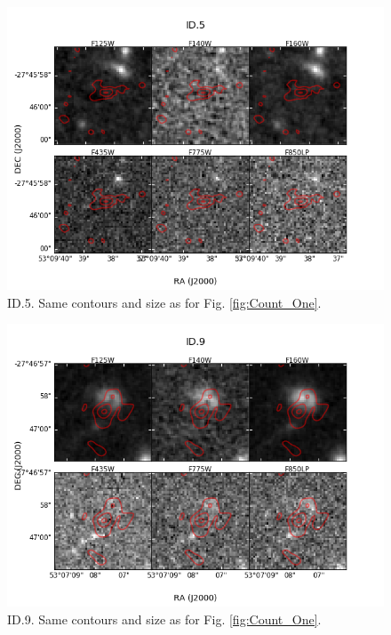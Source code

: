 \begin{figure}[!htbp]
\centering \includegraphics[width=120mm]{Matched/ASPECS_Cutout_4.png}
\caption{ID.5. Same contours and size as for Fig. \ref{fig:Count_One}. }
\label{fig:Count_Five}
\end{figure}

\begin{figure}[!htbp]
\centering \includegraphics[width=120mm]{Matched/ASPECS_Cutout_8.png}
\caption{ID.9. Same contours and size as for Fig. \ref{fig:Count_One}.}
\label{fig:Count_Nine}
\end{figure}

